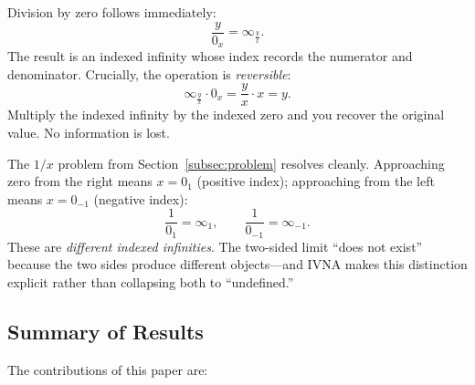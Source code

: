 \documentclass[12pt]{article}
\theoremstyle{definition}
\theoremstyle{remark}
\newcommand{\vz}[1]{0_{#1}}             %
\newcommand{\vi}[1]{\infty_{#1}}        %
\begin{document}
Division by zero follows immediately:
\begin{equation}
\label{eq:divzero}
\frac{y}{\vz{x}} = \vi{\frac{y}{x}}.
\end{equation}
The result is an indexed infinity whose index records the numerator and
denominator. Crucially, the operation is \emph{reversible}:
\[
\vi{\frac{y}{x}} \cdot \vz{x} = \frac{y}{x} \cdot x = y.
\]
Multiply the indexed infinity by the indexed zero and you recover
the original value. No information is lost.

The $1/x$ problem from Section~\ref{subsec:problem} resolves cleanly. Approaching zero
from the right means $x = \vz{1}$ (positive index); approaching from
the left means $x = \vz{-1}$ (negative index):
\[
\frac{1}{\vz{1}} = \vi{1}, \qquad
\frac{1}{\vz{-1}} = \vi{-1}.
\]
These are \emph{different indexed infinities}. The two-sided limit ``does
not exist'' because the two sides produce different objects---and IVNA
makes this distinction explicit rather than collapsing both to ``undefined.''

\subsection{Summary of Results}

The contributions of this paper are:
\end{document}
